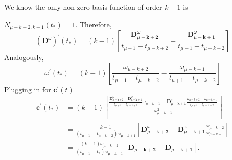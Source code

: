 \documentclass[acmtog]{acmart}
\begin{document}
We know the only non-zero basis function of order $k-1$ is

$N_{\mu-k+2, k-1}\left(t_*\right)=1$. Therefore,
$$
\left(\mathbf{D}^\omega\right)^{\prime}\left(t_*\right)=(k-1)\left[\frac{\mathbf{D}_{\mu-\mathbf{k}+\mathbf{2}}^\omega}{t_{\mu+1}-t_{\mu-k+2}}-\frac{\mathbf{D}_{\mu-\mathbf{k}+\mathbf{1}}^\omega}{t_{\mu+1}-t_{\mu-k+2}}\right]
$$
Analogously,
$$
\omega^{\prime}\left(t_*\right)=(k-1)\left[\frac{\omega_{\mu-k+2}}{t_{\mu+1}-t_{\mu-k+2}}-\frac{\omega_{\mu-k+1}}{t_{\mu+1}-t_{\mu-k+2}}\right]
$$
Plugging in for $\mathbf{c}^{\prime}(t)$
$$
\begin{aligned}
\mathbf{c}^{\prime}\left(t_*\right) & =(k-1)\left[\frac{\frac{\mathbf{D}_{\mu-\mathbf{k}+2}^\omega-\mathbf{D}_{\mu-\mathbf{k}+\mathbf{1}}^\omega}{t_{\mu+1}-t_{\mu-k+2}} \omega_{\mu-k+1}-\mathbf{D}_{\mu-\mathbf{k}+\mathbf{1}}^\omega \frac{\omega_{\mu-k+2}-\omega_{\mu-k+1}}{t_{\mu+1}-t_{\mu-k+2}}}{\omega_{\mu-k+1}^2}\right] \\
& =\frac{k-1}{\left(t_{\mu+1}-t_{\mu-k+2}\right) \omega_{\mu-k+1}}\left[\mathbf{D}_{\mu-\mathbf{k + 2}}^\omega-\mathbf{D}_{\mu-\mathbf{k}+\mathbf{1}}^\omega \frac{\omega_{\mu-k+2}}{\omega_{\mu-k+1}}\right] \\
& =\frac{(k-1) \omega_{\mu-k+2}}{\left(t_{\mu+1}-t_*\right) \omega_{\mu-k+1}}\left[\mathbf{D}_{\mu-\mathbf{k}+\mathbf{2}}-\mathbf{D}_{\mu-\mathbf{k}+\mathbf{1}}\right] .
\end{aligned}
$$
\end{document}
